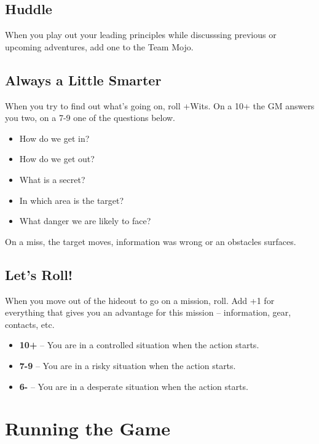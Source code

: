 \documentclass{book}
\begin{document}
\section*{Huddle}
When you play out your leading principles while discusssing previous or upcoming adventures, add one to the Team Mojo.

\section*{Always a Little Smarter}
When you try to find out what's going on, roll +Wits. On a 10+ the GM answers you two, on a 7-9 one of the questions below.
\begin{itemize}
    \item How do we get in?
    \item How do we get out?
    \item What is a secret?
    \item In which area is the target?
    \item What danger we are likely to face?
\end{itemize}
On a miss, the target moves, information was wrong or an obstacles surfaces.

\section*{Let's Roll!}
When you move out of the hideout to go on a mission, roll. Add +1 for everything that gives you an advantage for this mission -- information, gear, contacts, etc.
\begin{itemize}
    \item \textbf{10+} -- You are in a controlled situation when the action starts.
    \item \textbf{7-9} -- You are in a risky situation when the action starts.
    \item \textbf{6-} -- You are in a desperate situation when the action starts.
\end{itemize}

\chapter*{Running the Game}
\end{document}
